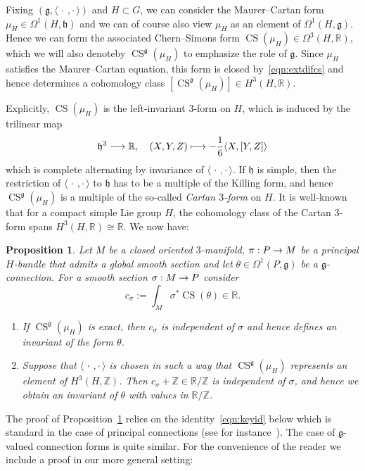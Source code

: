 \documentclass[10pt,a4paper]{amsart}
\newcommand{\si}{\sigma}
\newcommand{\Om}{\Omega}
\newcommand{\B}[2]{\langle#1,#2\rangle}
\DeclareMathOperator{\CS}{CS}
\newcommand*{\R}{\mathbb{R}}
\newcommand{\Z}{\mathbb{Z}}
\newcommand{\fkg}{\mathfrak{g}}
\newcommand{\fkh}{\mathfrak{h}}
\renewcommand*{\to}{\mathchoice{\longrightarrow}{\rightarrow}{\rightarrow}{\rightarrow}}
\let\oldmapsto\mapsto
\renewcommand*{\mapsto}{\mathchoice{\longmapsto}{\oldmapsto}{\oldmapsto}{\oldmapsto}}
\newcommand*{\relabel}{\renewcommand{\labelenumi}{(\theenumi)}}
\newcommand*{\romanenumi}{\renewcommand*{\theenumi}{\roman{enumi}}\relabel}
\newtheorem{prop}[theo]{Proposition}
\theoremstyle{definition}\newtheorem{defi}[theo]{Definition}
\begin{document}
Fixing $(\fkg,\B{\,\cdot\,}{\cdot\,})$ and $H\!\!\subset\! G$, we can consider the Maurer--Cartan form ${\mu_H\!\in\!\Om^1(H,\fkh)}$ and we can of course also view $\mu_H$ as an element of $\Om^1(H,\fkg)$. Hence we can form the associated Chern--Simons form $\CS(\mu_H)\in\Om^3(H,\R)$, which we will also denote\linebreak by $\CS^{\fkg}(\mu_H)$ to emphasize the role of $\fkg$. Since $\mu_H$ satisfies the Maurer--Cartan equation, this form is closed by~\eqref{eqn:extdifcs} and hence determines a cohomology class $[\CS^{\fkg}(\mu_H)]\in H^3(H,\R)$.

Explicitly, $\CS(\mu_H)$ is the left-invariant $3$-form on $H$, which is induced by the trilinear map
\[
\fkh^3\to\R, \quad (X,Y,Z)\mapsto -\frac16\B{X}{[Y,Z]}
\]
which is complete alternating by invariance of $\B{\,\cdot\,}{\cdot\,}$. If $\fkh$ is simple, then the restriction of $\B{\,\cdot\,}{\cdot\,}$ to $\fkh$ has to be a multiple of the Killing form, and hence $\CS^{\fkg}(\mu_H)$ is a multiple of the so-called
\emph{Cartan $3$-form} on $H$. It is well-known that for a compact simple Lie group $H$, the cohomology class of the Cartan $3$-form spans $H^3(H,\R)\cong\R$. We now have:

\goodbreak
\begin{prop}\label{prop:pullbacks}
Let $M$ be a closed oriented $3$-manifold, $\pi : P \to M$ be a principal $H$-bundle that admits a global smooth section and let $\theta\in\Om^1(P,\fkg)$ be a $\fkg$-connection. For a smooth section $\si: M\to P$ consider
\[
c_\si:=\int_M \si^*\CS(\theta)\in\R.
\]
\begin{enumerate}\romanenumi
\item\label{prop3.3.1} If $\CS^{\fkg}(\mu_H)$ is exact, then $c_\si$ is independent of $\si$ and hence defines an invariant of the form $\theta$.

\item\label{prop3.3.2} Suppose that $\B{\,\cdot\,}{\cdot\,}$ is chosen in such a way that $\CS^\fkg(\mu_H)$ represents an element of $H^3(H,\Z)$. Then $c_\si+\Z\in\R/\Z$ is independent of $\si$, and hence we obtain an invariant of $\theta$ with values in $\R/\Z$.
\end{enumerate}
\end{prop}

The proof of Proposition~\ref{prop:pullbacks} relies on the identity~\eqref{eqn:keyid} below which is standard in the case of principal connections (see for instance~\cite{MR1337109}). The case of $\fkg$-valued connection forms is quite similar. For the convenience of the reader we include a proof in our more general setting:
\end{document}
